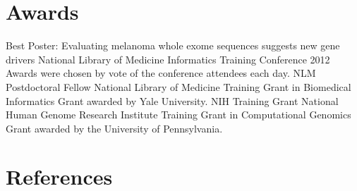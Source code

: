 \documentclass [10pt, letterpaper]{moderncv}
\begin{document}
\section {Awards}
         {Best Poster: Evaluating melanoma whole exome sequences suggests new gene drivers}
         {National Library of Medicine Informatics Training Conference 2012}
         {}
         {}
         {Awards were chosen by vote of the conference attendees each day.}
         {NLM Postdoctoral Fellow}
         {National Library of Medicine Training Grant
          in Biomedical Informatics}
         {}
         {}
         {Grant awarded by Yale University.}
         {NIH Training Grant}
         {National Human Genome Research Institute Training Grant
          in Computational Genomics}
         {}
         {}
         {Grant awarded by the University of Pennsylvania.}




\section {References}
\end{document}
